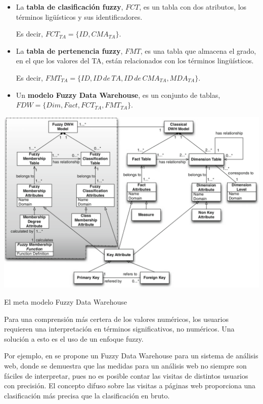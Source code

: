 \documentclass{fancyslides}
\begin{document}
\begin{frame}
\misc
{
\begin{itemize}
  \item \justifying La \textbf{tabla de clasificación fuzzy}, $FCT$, es un tabla con dos atributos, los términos ligüísticos y sus identificadores.
  
  Es decir, $FCT_{TA} = \{ ID, CMA_{TA} \}$.
  \item \justifying La \textbf{tabla de pertenencia fuzzy}, $FMT$, es una tabla que almacena el grado, en el que los valores del TA, están relacionados con los términos lingüísticos.
  
  Es decir, $FMT_{TA} = \{ ID, ID \, de \, TA, ID \, de \, CMA_{TA}, MDA_{TA} \}$.
  
  \item \justifying Un \textbf{modelo Fuzzy Data Warehouse}, es un conjunto de tablas, $FDW = \{Dim, Fact, FCT_{TA}, FMT_{TA} \}$.
\end{itemize}
}
\end{frame}

\begin{frame}
\misc
{

\begin{center}
\includegraphics[scale=0.25]{fuzzy2}

El meta modelo Fuzzy Data Warehouse
\end{center}

}
\end{frame}

\begin{frame}
\misc
{
\justifying Para una comprensión más certera de los valores numéricos, los usuarios requieren una interpretación en términos significativos, no numéricos.
Una solución a esto es el uso de un enfoque fuzzy.

Por ejemplo, en \cite{Fasel09} se propone un Fuzzy Data Warehouse para un sistema de análisis web, donde se demuestra que las medidas para un análisis web no siempre son fáciles de interpretar, pues no es posible contar las visitas de distintos usuarios con precisión.
El concepto difuso sobre las visitas a páginas web proporciona una clasificación más precisa que la clasificación en bruto.
}
\end{frame}
\end{document}
